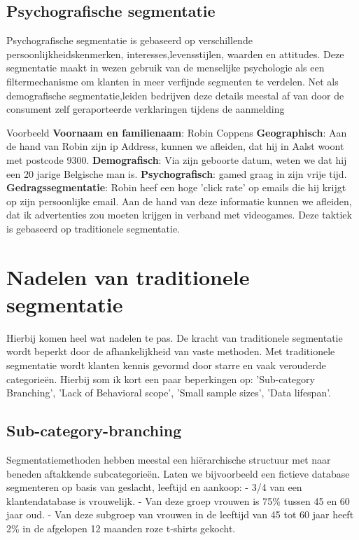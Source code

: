 \subsection{Psychografische segmentatie}
Psychografische segmentatie is gebaseerd op verschillende persoonlijkheidskenmerken, interesses,levensstijlen, waarden en attitudes. Deze segmentatie maakt in wezen gebruik van de menselijke psychologie als een filtermechanisme om klanten in meer verfijnde segmenten te verdelen. Net als demografische segmentatie,leiden bedrijven deze details meestal af van door de consument zelf geraporteerde verklaringen tijdens de aanmelding

Voorbeeld\newline
\textbf{Voornaam en familienaam}: Robin Coppens \newline
\textbf{Geographisch}: Aan de hand van Robin zijn ip Address, kunnen we afleiden, dat hij in Aalst woont met postcode 9300.\newline
\textbf{Demografisch}: Via zijn geboorte datum, weten we dat hij een 20 jarige Belgische man is.\newline
\textbf{Psychografisch}: gamed graag in zijn vrije tijd.\newline
\textbf{Gedragssegmentatie}: Robin heef een hoge 'click rate' op emails die hij krijgt op zijn persoonlijke email.
Aan de hand van deze informatie kunnen we afleiden, dat ik advertenties zou moeten krijgen in verband met videogames. Deze taktiek is gebaseerd op traditionele segmentatie.\newline

\section{Nadelen van traditionele segmentatie}
Hierbij komen heel wat nadelen te pas. De kracht van traditionele segmentatie wordt beperkt door de afhankelijkheid van vaste methoden. Met traditionele segmentatie wordt klanten kennis gevormd door starre en vaak verouderde categorieën. Hierbij som ik kort een paar beperkingen op: 'Sub-category Branching', 'Lack of Behavioral scope', 'Small sample sizes', 'Data lifespan'.

\subsection{Sub-category-branching}
Segmentatiemethoden hebben meestal een hiërarchische structuur met naar beneden aftakkende subcategorieën. Laten we bijvoorbeeld een fictieve database segmenteren op basis van geslacht, leeftijd en aankoop:\newline
- 3/4 van een klantendatabase is vrouwelijk.\newline
- Van deze groep vrouwen is 75\% tussen 45 en 60 jaar oud.\newline
- Van deze subgroep van vrouwen in de leeftijd van 45 tot 60 jaar heeft 2\% in de afgelopen 12 maanden roze t-shirts gekocht. \newline

